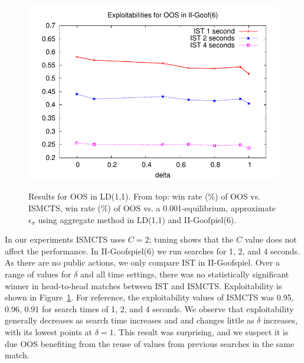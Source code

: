 \documentclass[letterpaper]{article}
\begin{document}
\begin{figure}[t!]
\begin{center}
\includegraphics[scale=0.5]{plots/goof-expl} \\
\caption{Results for OOS in LD(1,1). From top: win rate (\%) of OOS vs. ISMCTS, win rate (\%) of 
OOS vs. a 0.001-equilibrium, approximate $\epsilon_{\sigma}$ using aggregate method in LD(1,1) 
and II-Goofpiel(6).  }
\label{fig:results}
\end{center}
\end{figure}

In our experiments ISMCTS uses $C = 2$; tuning shows that the $C$ value does not 
affect the performance. 
In II-Goofspiel(6) we run searches for 1, 2, and 4 seconds.
As there are no public actions, we only compare IST in II-Goofspiel. 
Over a range of values for $\delta$ and all time settings, there was no statistically significant
winner in head-to-head matches between IST and ISMCTS. 
Exploitability is shown in Figure~\ref{fig:results}. 
For reference, the exploitability values of ISMCTS was 0.95, 0.96, 0.91 for search times of 
1, 2, and 4 seconds. We observe that exploitability generally 
decreases as search time increases and and changes little as $\delta$ increases, with its 
lowest points at $\delta = 1$. 
This result was surprising, and we suspect it is due OOS benefiting from the reuse of 
values from previous searches in the same match. 
\end{document}
